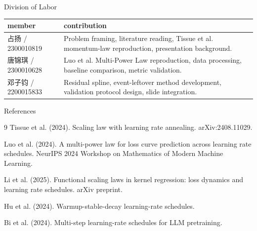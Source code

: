 \documentclass[fontset=fandol,aspectratio=169,10pt]{ctexbeamer}
\newcommand{\MemberA}{占扬 / 2300010819}
\newcommand{\MemberB}{唐锦琪 / 2300010628}
\newcommand{\MemberC}{邓子钧 / 2200015833}
\begin{document}
\begin{frame}{Division of Labor}
  \begin{table}
    \centering
    \scriptsize
    \begin{tabularx}{0.96\textwidth}{lX}
      \toprule
      member & contribution\\
      \midrule
      \MemberA & Problem framing, literature reading, Tissue et al. momentum-law reproduction, presentation background.\\
      \MemberB & Luo et al. Multi-Power Law reproduction, data processing, baseline comparison, metric validation.\\
      \MemberC & Residual spline, event-leftover method development, validation protocol design, slide integration.\\
      \bottomrule
    \end{tabularx}
  \end{table}
\end{frame}

\begin{frame}{References}
  \scriptsize
  \begin{thebibliography}{9}
    Tissue et al. (2024).
    \newblock Scaling law with learning rate annealing.
    \newblock arXiv:2408.11029.

    Luo et al. (2024).
    \newblock A multi-power law for loss curve prediction across learning rate schedules.
    \newblock NeurIPS 2024 Workshop on Mathematics of Modern Machine Learning.

    Li et al. (2025).
    \newblock Functional scaling laws in kernel regression: loss dynamics and learning rate schedules.
    \newblock arXiv preprint.

    Hu et al. (2024).
    \newblock Warmup-stable-decay learning-rate schedules.

    Bi et al. (2024).
    \newblock Multi-step learning-rate schedules for LLM pretraining.
  \end{thebibliography}
\end{frame}
\end{document}
